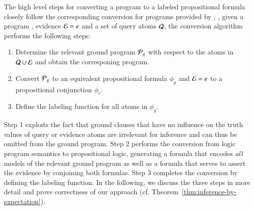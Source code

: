 




The high level steps for converting a \dcproblogsty program to a labeled propositional formula closely follow the corresponding conversion for \problogsty programs provided by \citet[Section 5]{fierens2015inference}, \ie, given a \dcproblogsty program \dcpprogram,
		evidence $\mathcal{E} =e$ and a set of query atoms $\mathcal{Q}$, the conversion algorithm performs the following steps:
\begin{enumerate}
    \item Determine the { relevant ground program} $\mathcal{P}_g$ with respect to the atoms in  $\mathcal{Q}\cup\mathcal{E}$ and obtain the corresponing \dfplpsty program. 
    \item Convert $\mathcal{P}_g$  to an { equivalent propositional formula} $\phi_g$ and $\mathcal{E} =e$ to a propositional conjunction $\phi_e$.
    \item Define the { labeling function} for all atoms in $\phi_g$.
\end{enumerate}
Step 1 exploits the fact that ground clauses that have no influence on the truth values of  query or evidence atoms are irrelevant for inference and can thus be omitted from the ground program. Step 2 performs the conversion from logic program semantics to propositional logic, generating a formula that encodes \emph{all} models of the relevant ground program as well as a formula that serves to assert the evidence by conjoining both formulas. 
Step 3 completes the conversion by defining the labeling function. 
In the following, we discuss the three steps in more detail and prove correctness of our approach (cf. Theorem~\ref{thm:inference-by-expectation}).  



